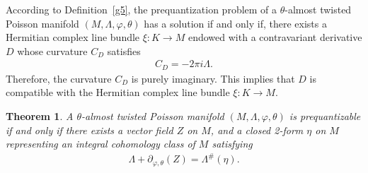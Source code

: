 \documentclass[a4paper,10pt]{article}
\numberwithin{equation}{section}
\theoremstyle{plain}
\newtheorem{theorem}{Theorem}[section]
\begin{document}
	According to Definition~\ref{g5}, the prequantization problem of a $\theta$-almost twisted Poisson manifold  $(M,\Lambda,\varphi,\theta)$ has a solution if and only if, there exists a  Hermitian complex line bundle $\xi: K\to M$ endowed with a contravariant derivative $D$ whose curvature $C_D$ satisfies \begin{align}\label{g6}
	C_D=-2\pi i\Lambda.
	\end{align}
	Therefore,  the curvature $C_D$  is  purely imaginary. This implies that  $D$ is  compatible with the Hermitian complex line bundle $\xi: K\to M$.
	\begin{theorem}\label{g7}
		A $\theta$-almost twisted Poisson manifold  $(M,\Lambda,\varphi,\theta)$ is prequantizable if and only if there exists a vector field $Z$ on $M$, and a closed 2-form $\eta$ on $M$  representing an integral cohomology  class of $M$ satisfying
		\begin{align}\label{g8}
		\Lambda+\partial_{\varphi,\theta}(Z)=\Lambda^{\#}(\eta).
		\end{align}
	\end{theorem}
\end{document}
